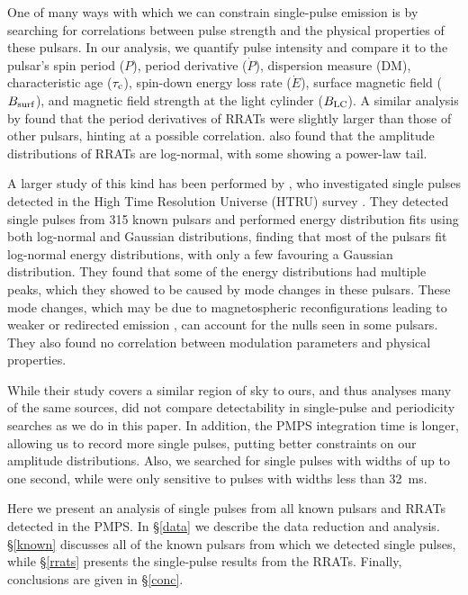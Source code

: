 \documentclass[fleqn,usenatbib]{mnras}
\begin{document}
One of many ways with which we can constrain single-pulse emission is by searching for
correlations between pulse strength and the physical properties of these pulsars. In our analysis, 
we quantify pulse intensity and compare it to the pulsar's spin period ($P$), period derivative 
($\dot{P}$), dispersion measure (DM), characteristic age ($\tau_{\rm c}$), spin-down energy loss 
rate ($\dot{E}$), surface magnetic field ($B_{\rm surf}$), and magnetic field strength at the 
light cylinder ($B_{\rm LC}$). A similar analysis by \citet{Cui:2017} found that the period 
derivatives of RRATs were slightly larger than those of other pulsars, hinting at a possible 
correlation. \citet{Cui:2017} also found that the amplitude distributions of RRATs are log-normal, 
with some showing a power-law tail.

A larger study of this kind has been performed by \citet{Burke-Spolaor:2012}, who investigated single pulses detected in the High Time Resolution Universe (HTRU) survey \citep{Keith:2010}. They detected
single pulses from 315 known pulsars and performed energy distribution fits using both log-normal
and Gaussian distributions, finding that most of the pulsars fit log-normal energy distributions,
with only a few favouring a Gaussian distribution. They found that some of the energy distributions
had multiple peaks, which they showed to be caused by mode changes in these pulsars. These mode
changes, which may be due to magnetospheric reconfigurations leading to weaker or redirected
emission \citep{Timokhin:2010}, can account for the nulls seen in some pulsars. They also found no
correlation between modulation parameters and physical properties.

While their study covers a similar region of sky to ours, and thus analyses many of the same sources, \citet{Burke-Spolaor:2012} did not compare detectability in 
single-pulse and periodicity searches as we do in this paper. In addition, the PMPS integration 
time is longer, allowing us to record more single pulses, putting better constraints on our amplitude distributions. Also, we searched for single pulses with widths of up to one second, while \citet{Burke-Spolaor:2012} were only sensitive to pulses with widths less than 32~ms.

Here we present an analysis of single pulses from all known pulsars and RRATs detected in the
PMPS. In \S \ref{data} we describe the data reduction and analysis. \S \ref{known}
discusses all of the known pulsars from which we detected single pulses, while \S \ref{rrats}
presents the single-pulse results from the RRATs. Finally, conclusions are given in \S \ref{conc}.
\end{document}
